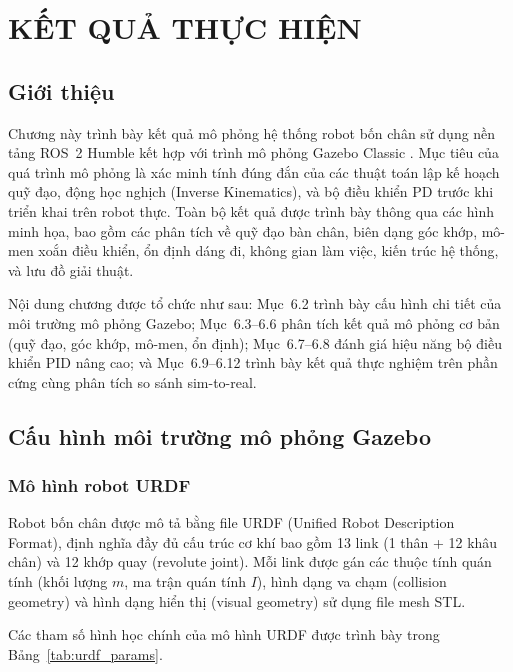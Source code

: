 \chapter{KẾT QUẢ THỰC HIỆN}


%

\section{Giới thiệu}
Chương này trình bày kết quả mô phỏng hệ thống robot bốn chân sử dụng nền tảng ROS~2 Humble \cite{ros2docs} kết hợp với trình mô phỏng Gazebo Classic \cite{gazebo}. Mục tiêu của quá trình mô phỏng là xác minh tính đúng đắn của các thuật toán lập kế hoạch quỹ đạo, động học nghịch (Inverse Kinematics), và bộ điều khiển PD trước khi triển khai trên robot thực. Toàn bộ kết quả được trình bày thông qua các hình minh họa, bao gồm các phân tích về quỹ đạo bàn chân, biên dạng góc khớp, mô-men xoắn điều khiển, ổn định dáng đi, không gian làm việc, kiến trúc hệ thống, và lưu đồ giải thuật.

Nội dung chương được tổ chức như sau: Mục~6.2 trình bày cấu hình chi tiết của môi trường mô phỏng Gazebo; Mục~6.3--6.6 phân tích kết quả mô phỏng cơ bản (quỹ đạo, góc khớp, mô-men, ổn định); Mục~6.7--6.8 đánh giá hiệu năng bộ điều khiển PID nâng cao; và Mục~6.9--6.12 trình bày kết quả thực nghiệm trên phần cứng cùng phân tích so sánh sim-to-real.

\section{Cấu hình môi trường mô phỏng Gazebo}

\subsection{Mô hình robot URDF}

Robot bốn chân được mô tả bằng file URDF (Unified Robot Description Format), định nghĩa đầy đủ cấu trúc cơ khí bao gồm 13 link (1 thân + 12 khâu chân) và 12 khớp quay (revolute joint). Mỗi link được gán các thuộc tính quán tính (khối lượng $m$, ma trận quán tính $I$), hình dạng va chạm (collision geometry) và hình dạng hiển thị (visual geometry) sử dụng file mesh STL.

Các tham số hình học chính của mô hình URDF được trình bày trong Bảng~\ref{tab:urdf_params}.

